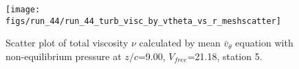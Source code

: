 \begin{figure}[H]
\centering
\texttt{[image: figs/run\_44/run\_44\_turb\_visc\_by\_vtheta\_vs\_r\_meshscatter]}
\caption{Scatter plot of total viscosity $\nu$ calculated by mean $\bar{v}_{\theta}$ equation with non-equilibrium pressure at $z/c$=9.00, $V_{free}$=21.18, station 5.}
\label{fig:run_44_turb_visc_by_vtheta_vs_r_meshscatter}
\end{figure}


